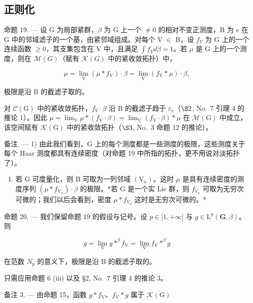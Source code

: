 \subsection{正则化}

命题 19. --- 设 G 为局部紧群，\(\beta\) 为 G 上一个 \(\neq 0\) 的相对不变正测度，B 为 \(e\) 在 G 中的邻域滤子的一个基，由紧邻域组成。对每个 V \(\in\) B，设 \(f_{V}\) 为 G 上的一个连续函数 \(\geqslant 0\)，其支集包含在 V 中，且满足 \(\int f_{V} d\beta = 1\)。若 \(\mu\) 是 G 上的一个测度，则在 \(\mathcal{M}(G)\)（赋有 \(\mathcal{K}(G)\) 中的紧收敛拓扑）中，

\[
\mu = \lim _ {\mathrm{V}} (\mu * f _ {\mathrm{V}}) \cdot \beta = \lim _ {\mathrm{V}} (f _ {\mathrm{V}} * \mu) \cdot \beta ,
\]

极限是沿 B 的截滤子取的。

对 \(\mathcal{C}(\mathrm{G})\) 中的紧收敛拓扑，\(f_{V} \cdot \beta\) 沿 B 的截滤子趋于 \(\varepsilon_{e}\)（\(\S2\), No.~7 引理 4 的推论 1）。因此 \(\mu = \lim_{\mathrm{V}} \mu * (f_{\mathrm{V}} \cdot \beta) = \lim_{\mathrm{V}} (f_{\mathrm{V}} \cdot \beta) * \mu\) 在 \(\mathcal{M}(\mathrm{G})\) 中成立，该空间赋有 \(\mathcal{K}(\mathrm{G})\) 中的紧收敛拓扑（\(\S3\), No.~3 命题 12 的推论）。

备注. --- 1) 由此我们看到，G 上的每个测度都是一些测度的极限，这些测度关于每个 Haar 测度都具有连续密度（对命题 19 中所指的拓扑，更不用说对淡拓扑了）。

\begin{enumerate}
\def\labelenumi{\arabic{enumi})}
\setcounter{enumi}{1}
\tightlist
\item
  若 G 可度量化，则 B 可取为一列邻域 \((\mathrm{V}_{n})\)。这时 \(\mu\) 是具有连续密度的测度序列 \((\mu * f_{\mathrm{V}_{n}}) \cdot \beta\) 的极限。*若 G 是一个实 Lie 群，则 \(f_{V_{n}}\) 可取为无穷次可微的；我们以后会看到，密度 \(\mu * f_{V_{n}}\) 这时是无穷次可微的。*
\end{enumerate}

命题 20. --- 我们保留命题 19 的假设与记号。设 \(p \in [1, +\infty[\) 与 \(g \in \mathrm{L}^p(\mathbf{G}, \beta)\)。则

\[
g = \lim _ {\mathrm{V}} g * ^ {\beta} f _ {\mathrm{V}} = \lim _ {\mathrm{V}} f _ {\mathrm{V}} * ^ {\beta} g
\]

在范数 \(N_{p}\) 的意义下，极限是沿 B 的截滤子取的。

只需应用命题 6 (iii) 以及 §2, No.~7 引理 4 的推论 3。

备注 3. --- 由命题 15，函数 \(g * f_{\mathrm{V}}\)、\(f_{\mathrm{V}} * g\) 属于 \(\overline{\mathcal{K}(\mathrm{G})}\)

